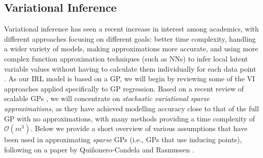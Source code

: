 \documentclass{mprop}
\theoremstyle{definition}
\begin{document}
\subsection{Variational Inference} \label{sec:vi_literature}

Variational inference has seen a recent increase in interest among academics,
with different approaches focusing on different goals: better time complexity,
handling a wider variety of models, making approximations more accurate, and
using more complex function approximation techniques (such as NNs)
to infer local latent variable values without having to calculate them
individually for each data point \cite{DBLP:journals/corr/abs-1711-05597}. As
our IRL model is based on a GP, we will begin by reviewing some of the VI
approaches applied specifically to GP regression. Based on a recent review of
scalable GPs \cite{DBLP:journals/corr/abs-1711-05597}, we will concentrate on
\emph{stochastic variational sparse approximations}, as they have achieved
modelling accuracy close to that of the full GP with no approximations, with
many methods providing a time complexity of $\mathcal{O}(m^3)$. Below we provide
a short overview of various assumptions that have been used in approximating
\emph{sparse} GPs (i.e., GPs that use inducing points), following on a paper by
Qui\~{n}onero-Candela and Rasmussen \cite{DBLP:journals/jmlr/CandelaR05}.
\end{document}
